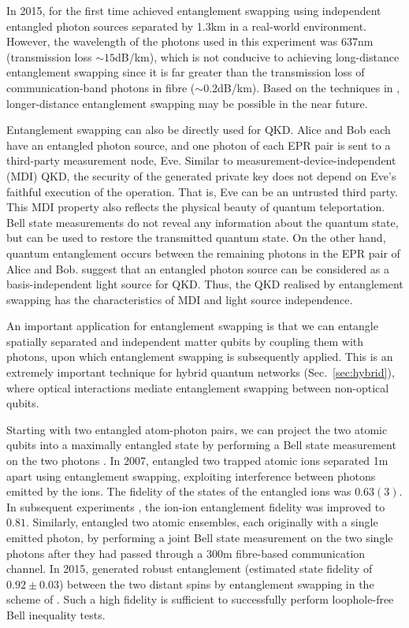 \documentclass[aps,rmp,twocolumn,amsmath,amssymb,nofootinbib,superscriptaddress,longbibliography,floatfix,table-of-contents,eqsecnum]{revtex4-1}
\begin{document}
In 2015, \cite{bib:Nat_526_682} for the first time achieved entanglement swapping using independent entangled photon sources separated by 1.3km in a real-world environment. However, the wavelength of the photons used in this experiment was 637nm (transmission loss \mbox{$\sim 15$dB/km}), which is not conducive to achieving long-distance entanglement swapping since it is far greater than the transmission loss of communication-band photons in fibre (\mbox{$\sim 0.2$dB/km}). Based on the techniques in \cite{bib:Nat_phot_10_671, bib:Nat_phot_10_676}, longer-distance entanglement swapping may be possible in the near future.

Entanglement swapping can also be directly used for QKD. Alice and Bob each have an entangled photon source, and one photon of each EPR pair is sent to a third-party measurement node, Eve. Similar to measurement-device-independent (MDI) QKD, the security of the generated private key does not depend on Eve's faithful execution of the operation. That is, Eve can be an untrusted third party. This MDI property also reflects the physical beauty of quantum teleportation. Bell state measurements do not reveal any information about the quantum state, but can be used to restore the transmitted quantum state. On the other hand, quantum entanglement occurs between the remaining photons in the EPR pair of Alice and Bob. \cite{bib:PRL_90_057902, bib:NJP_10_2008} suggest that an entangled photon source can be considered as a basis-independent light source for QKD. Thus, the QKD realised by entanglement swapping has the characteristics of MDI and light source independence.

An important application for entanglement swapping is that we can entangle spatially separated and independent matter qubits by coupling them with photons, upon which entanglement swapping is subsequently applied. This is an extremely important technique for hybrid quantum networks (Sec.~\ref{sec:hybrid}), where optical interactions mediate entanglement swapping between non-optical qubits.

Starting with two entangled atom-photon pairs, we can project the two atomic qubits into a maximally entangled state by performing a Bell state measurement on the two photons \cite{bib:Nature_428_153, bib:PRL_96_030404}. In 2007, \cite{bib:Nature_449_68} entangled two trapped atomic ions separated 1m apart using entanglement swapping, exploiting interference between photons emitted by the ions. The fidelity of the states of the entangled ions was $0.63(3)$. In subsequent experiments \cite{bib:PRL_100_150404}, the ion-ion entanglement fidelity was improved to $0.81$. Similarly, \cite{bib:Nature_454_1098} entangled two atomic ensembles, each originally with a single emitted photon, by performing a joint Bell state measurement on the two single photons after they had passed through a 300m fibre-based communication channel. In 2015, \cite{bib:Nature_526_682} generated robust entanglement (estimated state fidelity of $0.92\pm0.03$) between the two distant spins by entanglement swapping in the scheme of \cite{bib:PRA_71_060310, bib:Nature_497_86}. Such a high fidelity is sufficient to successfully perform loophole-free Bell inequality tests.
\end{document}
